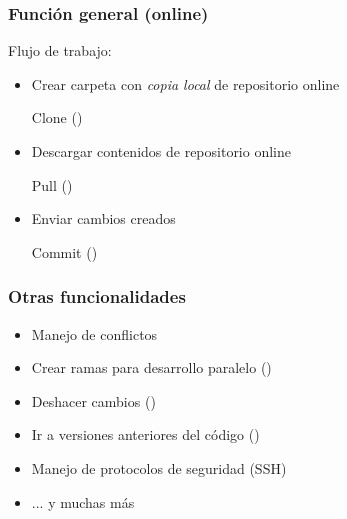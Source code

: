 \documentclass[14pt,aspectratio=169,xcolor=dvipsnames]{beamer}
\begin{document}
\begin{frame}\frametitle{Función general (online)}
    Flujo de trabajo:
    \begin{itemize}
        \item Crear carpeta con \emph{copia local} de repositorio online
            \begin{minipage}{0.35\textwidth}
            \begin{block}{}
                Clone \hfill()
            \end{block}
            \end{minipage}

        \item Descargar contenidos de repositorio online \phantom{ }
            
            \begin{minipage}{0.35\textwidth}
            \begin{block}{}
                Pull \hfill()
            \end{block}
            \end{minipage}
        \item Enviar cambios creados \phantom{ }

            \begin{minipage}{0.35\textwidth}
            \begin{block}{}
                Commit \hfill()
            \end{block}
            \end{minipage}
    \end{itemize}
\end{frame}
\begin{frame}\frametitle{Otras funcionalidades}
    \begin{itemize}
        \item Manejo de conflictos 
        \item Crear ramas para desarrollo paralelo ()
        \item Deshacer cambios ()
        \item Ir a versiones anteriores del código ()
        \item Manejo de protocolos de seguridad (SSH)
        \item ... y \alert{muchas} más
    \end{itemize}
\end{frame}
\end{document}

